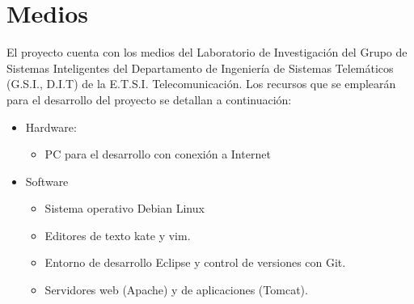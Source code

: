 \documentclass[a4paper,11pt]{report}
\begin{document}
\chapter*{Medios}

El proyecto cuenta con los medios del Laboratorio de Investigación del Grupo de
Sistemas Inteligentes del Departamento de Ingeniería de Sistemas Telemáticos (G.S.I.,
D.I.T) de la E.T.S.I. Telecomunicación. Los recursos que se emplearán para el desarrollo
del proyecto se detallan a continuación:
\begin{itemize}
  \item Hardware:
  \begin{itemize}
    \item PC para el desarrollo con conexión a Internet
  \end{itemize}
  \item Software
  \begin{itemize}
    \item Sistema operativo Debian Linux
    \item Editores de texto kate y vim.
    \item Entorno de desarrollo Eclipse y control de versiones con Git.
    \item Servidores web (Apache) y de aplicaciones (Tomcat).
  \end{itemize}
\end{itemize}

\nocite{*}
 
{
\let\clearpage\relax
\small

}
\end{document}
